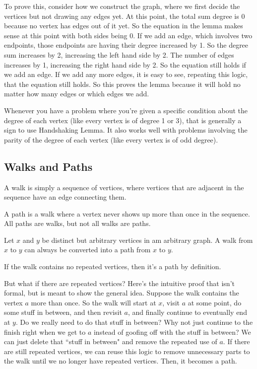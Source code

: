 \documentclass[11pt]{scrartcl}
\begin{document}
To prove this, consider how we construct the graph, where we first decide the vertices but not drawing any edges yet. At this point, the total sum degree is 0 because no vertex has edges out of it yet. So the equation in the lemma makes sense at this point with both sides being 0. If we add an edge, which involves two endpoints, those endpoints are having their degree increased by 1. So the degree sum increases by 2, increasing the left hand side by 2. The number of edges increases by 1, increasing the right hand side by 2. So the equation still holds if we add an edge. If we add any more edges, it is easy to see, repeating this logic, that the equation still holds. So this proves the lemma because it will hold no matter how many edges or which edges we add.

\begin{advice}
Whenever you have a problem where you're given a specific condition about the degree of each vertex (like every vertex is of degree 1 or 3), that is generally a sign to use Handshaking Lemma. It also works well with problems involving the parity of the degree of each vertex (like every vertex is of odd degree).
\end{advice}

\subsection{Walks and Paths}

\begin{definition}[Walk]
    A walk is simply a sequence of vertices, where vertices that are adjacent in the sequence have an edge connecting them.
\end{definition}

\begin{definition}[Path]
    A path is a walk where a vertex never shows up more than once in the sequence. All paths are walks, but not all walks are paths.
\end{definition}

\begin{lemma}
    Let $x$ and $y$ be distinct but arbitrary vertices in am arbitrary graph. A walk from $x$ to $y$ can always be converted into a path from $x$ to $y$.
\end{lemma}
If the walk contains no repeated vertices, then it's a path by definition.

But what if there are repeated vertices? Here's the intuitive proof that isn't formal, but is meant to show the general idea. Suppose the walk contains the vertex $a$ more than once. So the walk will start at $x$, visit $a$ at some point, do some stuff in between, and then revisit $a$, and finally continue to eventually end at $y$. Do we really need to do that stuff in between? Why not just continue to the finish right when we get to $a$ instead of goofing off with the stuff in between? We can just delete that ``stuff in between" and remove the repeated use of $a$. If there are still repeated vertices, we can reuse this logic to remove unnecessary parts to the walk until we no longer have repeated vertices. Then, it becomes a path.
\end{document}
